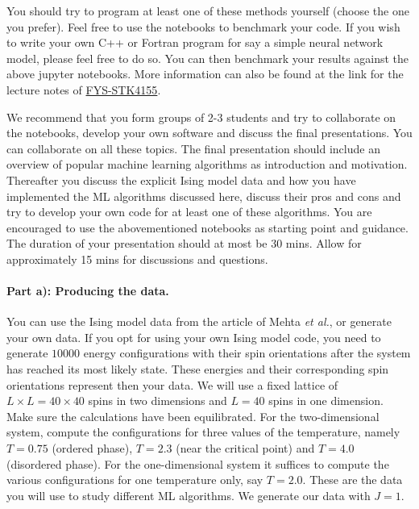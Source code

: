 \documentclass[%
oneside,                 %
final,                   %
10pt]{article}
\begin{document}
You should try to program at least one of these methods yourself (choose the one you prefer). 
Feel free to use the notebooks to benchmark your code.  If you wish to write your own C++ or Fortran program for say a simple neural network model, please feel free to do so.
You can then benchmark your results against the above jupyter notebooks.  More information can also be found at the link for the lecture notes of \href{{https://compphysics.github.io/MachineLearning/doc/web/course.html}}{FYS-STK4155}.


We recommend that you form groups of 2-3 students and try to
collaborate on the notebooks, develop your own software and discuss
the final presentations. You can collaborate on all these topics. The
final presentation should include an overview of popular machine
learning algorithms as introduction and motivation. Thereafter you
discuss the explicit Ising model data and how you have implemented the
ML algorithms discussed here, discuss their pros and cons and try to
develop your own code for at least one of these algorithms.  You are
encouraged to use the abovementioned notebooks as starting point and
guidance.  The duration of your presentation should at most be 30
mins. Allow for approximately 15 mins for discussions and questions.



\paragraph{Part a): Producing the data.}
You can use the Ising model data from the article of Mehta \emph{et al.}, or generate your own data. 
If you opt for using your own Ising model code, you need to generate $10000$ energy configurations with their spin orientations after the system has reached its most likely state. These energies and their corresponding spin orientations
represent then your data. 
We will use a fixed lattice of $L\times L = 40 \times 40$ spins in two dimensions and $L=40$ spins in one dimension. 
Make sure the calculations have been equilibrated. For the two-dimensional system, compute the configurations 
for three values of the temperature, namely $T=0.75$ (ordered phase), $T=2.3$ (near the critical point)  and $T=4.0$ (disordered phase).
For the one-dimensional system it suffices to compute the various configurations for one temperature only, say $T=2.0$.
These are the data you will use to study different ML algorithms.
We generate our data with $J=1$.
\end{document}
